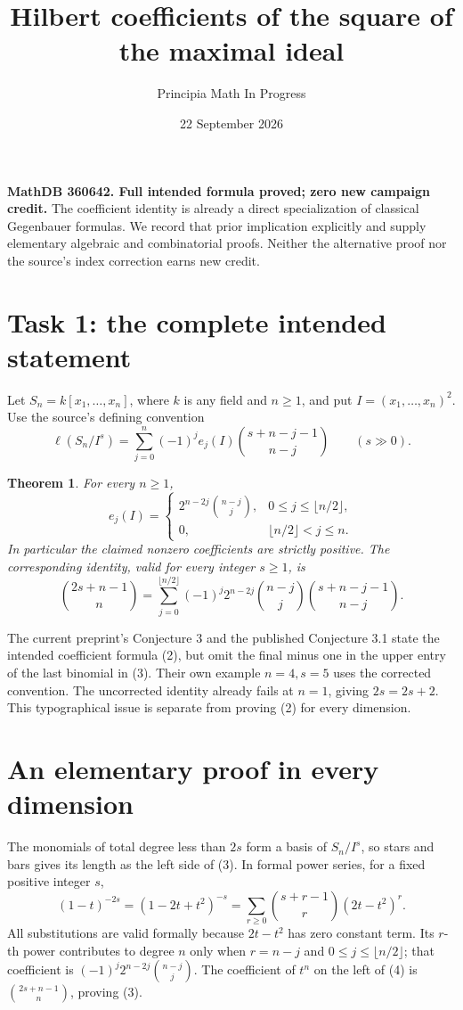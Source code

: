 \documentclass[11pt]{article}
\title{Hilbert coefficients of the square of the maximal ideal}
\author{Principia Math In Progress}
\date{22 September 2026}
\newtheorem{theorem}{Theorem}
\begin{document}
\maketitle
\noindent\textbf{MathDB 360642. Full intended formula proved;
zero new campaign credit.}
The coefficient identity is already a direct specialization of classical
Gegenbauer formulas. We record that prior implication explicitly and
supply elementary algebraic and combinatorial proofs. Neither the
alternative proof nor the source's index correction earns new credit.

\section*{Task 1: the complete intended statement}
Let \(S_n=k[x_1,\ldots,x_n]\), where \(k\) is any field and \(n\geq1\),
and put \(I=(x_1,\ldots,x_n)^2\). Use the source's defining convention
\[
 \ell(S_n/I^s)=\sum_{j=0}^n(-1)^j e_j(I)
                    \binom{s+n-j-1}{n-j}\qquad(s\gg0).       \tag{1}
\]
\begin{theorem}
For every \(n\geq1\),
\[
 e_j(I)=
 \begin{cases}
 2^{n-2j}\binom{n-j}{j},&0\leq j\leq\lfloor n/2\rfloor,\\
 0,&\lfloor n/2\rfloor<j\leq n.
 \end{cases}                                                \tag{2}
\]
In particular the claimed nonzero coefficients are strictly positive.
The corresponding identity, valid for every integer \(s\geq1\), is
\[
 \binom{2s+n-1}{n}
 =\sum_{j=0}^{\lfloor n/2\rfloor}(-1)^j2^{n-2j}
        \binom{n-j}{j}\binom{s+n-j-1}{n-j}.                  \tag{3}
\]
\end{theorem}
The current preprint's Conjecture 3 and the published Conjecture 3.1
state the intended coefficient formula (2), but omit the final minus
one in the upper entry of the last binomial in (3). Their own example
\(n=4,s=5\) uses the corrected convention. The uncorrected identity
already fails at \(n=1\), giving \(2s=2s+2\). This typographical issue
is separate from proving (2) for every dimension.

\section*{An elementary proof in every dimension}
The monomials of total degree less than \(2s\) form a basis of
\(S_n/I^s\), so stars and bars gives its length as the left side of (3).
In formal power series, for a fixed positive integer \(s\),
\[
 (1-t)^{-2s}=(1-2t+t^2)^{-s}
      =\sum_{r\geq0}\binom{s+r-1}{r}(2t-t^2)^r.             \tag{4}
\]
All substitutions are valid formally because \(2t-t^2\) has zero
constant term. Its \(r\)-th power contributes to degree \(n\) only
when \(r=n-j\) and \(0\leq j\leq\lfloor n/2\rfloor\); that
coefficient is \((-1)^j2^{n-2j}\binom{n-j}{j}\).
The coefficient of \(t^n\) on the left of (4) is
\(\binom{2s+n-1}{n}\), proving (3).
\end{document}
